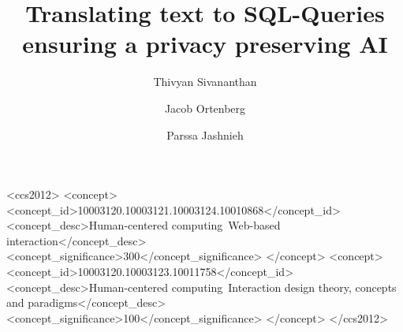 \documentclass[manuscript,review]{acmart}
\begin{document}
\title{Translating text to SQL-Queries ensuring a privacy preserving AI}
\author{Thivyan Sivananthan}
\author{Jacob Ortenberg}
\author{Parssa Jashnieh}
\address{Bergische Universität Wuppertal}




\begin{CCSXML}
  <ccs2012>
     <concept>
         <concept_id>10003120.10003121.10003124.10010868</concept_id>
         <concept_desc>Human-centered computing~Web-based interaction</concept_desc>
         <concept_significance>300</concept_significance>
         </concept>
     <concept>
         <concept_id>10003120.10003123.10011758</concept_id>
         <concept_desc>Human-centered computing~Interaction design theory, concepts and paradigms</concept_desc>
         <concept_significance>100</concept_significance>
         </concept>
   </ccs2012>
\end{CCSXML}
  


\maketitle
\end{document}
